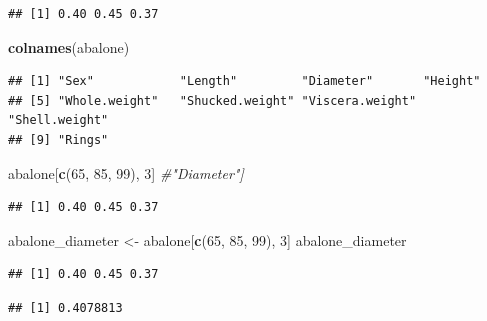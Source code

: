 \documentclass[
]{book}
\newenvironment{Shaded}{\begin{snugshade}}{\end{snugshade}}
\newcommand{\CommentTok}[1]{\textcolor[rgb]{0.56,0.35,0.01}{\textit{#1}}}
\newcommand{\DecValTok}[1]{\textcolor[rgb]{0.00,0.00,0.81}{#1}}
\newcommand{\FunctionTok}[1]{\textcolor[rgb]{0.13,0.29,0.53}{\textbf{#1}}}
\newcommand{\NormalTok}[1]{#1}
\newcommand{\OtherTok}[1]{\textcolor[rgb]{0.56,0.35,0.01}{#1}}
\newcommand{\SpecialCharTok}[1]{\textcolor[rgb]{0.81,0.36,0.00}{\textbf{#1}}}
\begin{document}
\begin{verbatim}
## [1] 0.40 0.45 0.37
\end{verbatim}

\begin{Shaded}
\begin{Highlighting}[]
\FunctionTok{colnames}\NormalTok{(abalone)}
\end{Highlighting}
\end{Shaded}

\begin{verbatim}
## [1] "Sex"            "Length"         "Diameter"       "Height"        
## [5] "Whole.weight"   "Shucked.weight" "Viscera.weight" "Shell.weight"  
## [9] "Rings"
\end{verbatim}

\begin{Shaded}
\begin{Highlighting}[]
\NormalTok{abalone[}\FunctionTok{c}\NormalTok{(}\DecValTok{65}\NormalTok{, }\DecValTok{85}\NormalTok{, }\DecValTok{99}\NormalTok{), }\DecValTok{3}\NormalTok{] }\CommentTok{\#"Diameter"]}
\end{Highlighting}
\end{Shaded}

\begin{verbatim}
## [1] 0.40 0.45 0.37
\end{verbatim}

\begin{Shaded}
\begin{Highlighting}[]
\NormalTok{abalone\_diameter }\OtherTok{\textless{}{-}}\NormalTok{ abalone[}\FunctionTok{c}\NormalTok{(}\DecValTok{65}\NormalTok{, }\DecValTok{85}\NormalTok{, }\DecValTok{99}\NormalTok{), }\DecValTok{3}\NormalTok{]}
\NormalTok{abalone\_diameter}
\end{Highlighting}
\end{Shaded}

\begin{verbatim}
## [1] 0.40 0.45 0.37
\end{verbatim}

\begin{Shaded}
\end{Shaded}

\begin{verbatim}
## [1] 0.4078813
\end{verbatim}
\end{document}
